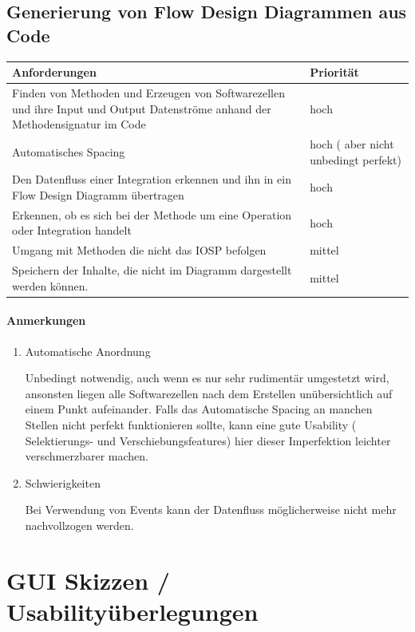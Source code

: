 \documentclass[a4paper,12pt,oneside]{book}
\begin{document}
\section{Generierung von Flow Design Diagrammen aus Code}
\label{sec:orgheadline20}

\begin{tabularx}{\textwidth}{X|l}
Anforderungen & Priorität\\
\hline
Finden von Methoden und Erzeugen von Softwarezellen und ihre Input und Output Datenströme anhand der Methodensignatur im Code & hoch\\ \hline
Automatisches Spacing & hoch ( aber nicht unbedingt perfekt)\\ \hline
Den Datenfluss einer Integration erkennen und ihn in ein Flow Design Diagramm übertragen & hoch\\ \hline
Erkennen, ob es sich bei der Methode um eine Operation oder Integration handelt & hoch\\ \hline
Umgang mit Methoden die nicht das IOSP befolgen & mittel\\ \hline
Speichern der Inhalte, die nicht im Diagramm dargestellt werden können. & mittel\\ \hline
\end{tabularx}

\subsubsection{Anmerkungen}
\label{sec:orgheadline19}
\begin{enumerate}
\item Automatische Anordnung
\label{sec:orgheadline17}

Unbedingt notwendig, auch wenn es nur sehr rudimentär umgestetzt wird, ansonsten liegen
alle Softwarezellen nach dem Erstellen unübersichtlich auf einem Punkt aufeinander.
Falls das Automatische Spacing an manchen Stellen nicht perfekt funktionieren
sollte, kann eine gute Usability ( Selektierungs- und Verschiebungsfeatures)
hier dieser Imperfektion leichter verschmerzbarer machen.

\item Schwierigkeiten
\label{sec:orgheadline18}

Bei Verwendung von Events kann der Datenfluss möglicherweise nicht mehr
nachvollzogen werden.
\end{enumerate}

\pagebreak
\chapter{GUI Skizzen / Usabilityüberlegungen}
\label{sec:orgheadline28}
\end{document}
